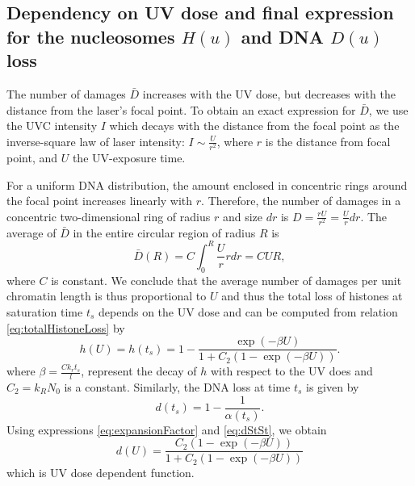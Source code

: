 \documentclass[12pt]{article}
\begin{document}
\subsection{Dependency on UV dose and final expression for the nucleosomes $H(u)$ and DNA $D(u)$ loss}

The number of damages $\bar{D}$ increases with the UV dose, but decreases with the distance from the laser's focal point. To obtain an exact expression for $\bar{D}$, we use the UVC intensity $I$ which decays with the distance from the focal point as the inverse-square law of laser intensity: $I \sim \frac{U}{r^2}$, where $r$ is the distance from focal point, and $U$ the UV-exposure time.

For a uniform DNA distribution, the amount enclosed in concentric rings around the focal point increases linearly with $r$. Therefore, the number of damages in a concentric two-dimensional ring of radius $r$ and size $dr$ is ${D}= \frac{rU}{r^2}=\frac{U}{r}dr$. The average of $\bar{D}$ in the entire circular region of radius $R$ is
\begin{equation*}
\bar{D}(R) = C\int_0^R \frac{U}{r} rdr = CUR,
\end{equation*}
where $C$ is constant. We conclude that the average number of damages per unit chromatin length is thus proportional to $U$ and thus the total loss of histones at saturation time $t_{s}$ depends on the UV dose and can be computed from relation \ref{eq:totalHistoneLoss} by
\begin{equation}\label{eq:totalHiostoneLossVsUV}
h(U)=h(t_s)=1-\frac{\exp(-\beta U)}{ 1+C_2(1-\exp(-\beta U))}.
\end{equation}
where $\beta=\frac{Ck_rt_s}{l}$, represent the decay of $h$ with respect to the UV does and $C_2=k_RN_0$ is a constant. Similarly, the DNA loss at time $t_{s}$ is given by
\begin{equation}\label{eq:dStSt}
d(t_s)= 1-\frac{1}{\alpha(t_s)}.
\end{equation}
Using expressions \ref{eq:expansionFactor} and \ref{eq:dStSt}, we obtain
\begin{equation}\label{eq:dnaLoss}
d(U)= \frac{C_2(1-\exp(-\beta U))}{1+C_2(1-\exp(-\beta U))}
\end{equation}
which is UV dose dependent function.

\end{document}

